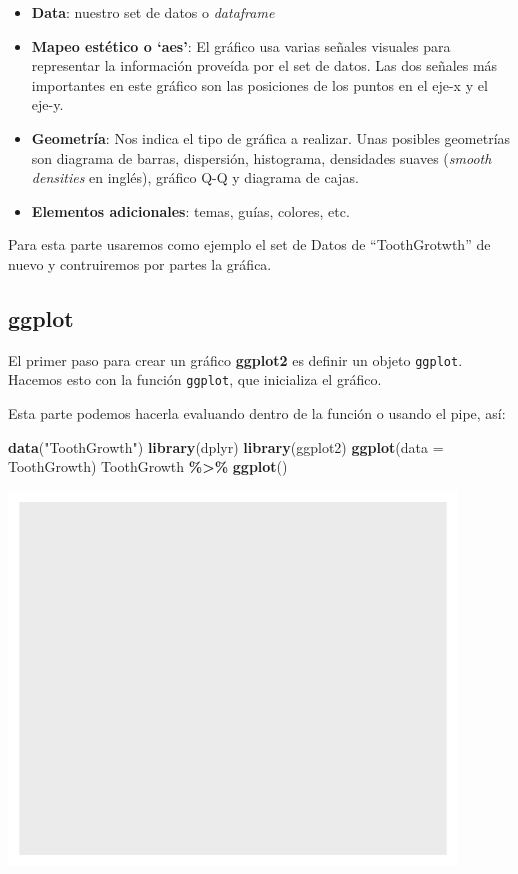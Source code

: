 \documentclass[
]{book}
\newenvironment{Shaded}{\begin{snugshade}}{\end{snugshade}}
\newcommand{\AttributeTok}[1]{\textcolor[rgb]{0.13,0.29,0.53}{#1}}
\newcommand{\FunctionTok}[1]{\textcolor[rgb]{0.13,0.29,0.53}{\textbf{#1}}}
\newcommand{\NormalTok}[1]{#1}
\newcommand{\SpecialCharTok}[1]{\textcolor[rgb]{0.81,0.36,0.00}{\textbf{#1}}}
\newcommand{\StringTok}[1]{\textcolor[rgb]{0.31,0.60,0.02}{#1}}
\begin{document}
\begin{itemize}
\item
  \textbf{Data}: nuestro set de datos o \emph{dataframe}
\item
  \textbf{Mapeo estético o `aes'}: El gráfico usa varias señales visuales para representar la información proveída por el set de datos.
  Las dos señales más importantes en este gráfico son las posiciones de los puntos en el eje-x y el eje-y.
\item
  \textbf{Geometría}: Nos indica el tipo de gráfica a realizar.
  Unas posibles geometrías son diagrama de barras, dispersión, histograma, densidades suaves (\emph{smooth densities} en inglés), gráfico Q-Q y diagrama de cajas.
\item
  \textbf{Elementos adicionales}: temas, guías, colores, etc.
\end{itemize}

Para esta parte usaremos como ejemplo el set de Datos de ``ToothGrotwth'' de nuevo y contruiremos por partes la gráfica.

\subsection{ggplot}\label{ggplot}

El primer paso para crear un gráfico \textbf{ggplot2} es definir un objeto \texttt{ggplot}.
Hacemos esto con la función \texttt{ggplot}, que inicializa el gráfico.

Esta parte podemos hacerla evaluando dentro de la función o usando el pipe, así:

\begin{Shaded}
\begin{Highlighting}[]
\FunctionTok{data}\NormalTok{(}\StringTok{"ToothGrowth"}\NormalTok{)}
\FunctionTok{library}\NormalTok{(dplyr)}
\FunctionTok{library}\NormalTok{(ggplot2)}
\FunctionTok{ggplot}\NormalTok{(}\AttributeTok{data =}\NormalTok{ ToothGrowth)}
\NormalTok{ToothGrowth }\SpecialCharTok{\%\textgreater{}\%} \FunctionTok{ggplot}\NormalTok{()}
\end{Highlighting}
\end{Shaded}

\begin{center}\includegraphics{_main_files/figure-latex/unnamed-chunk-204-1} \end{center}
\end{document}
